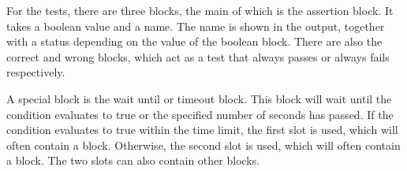 \documentclass[../main]{subfiles}
\begin{document}
\begin{wide}
    \begin{varwidth}{0.40\linewidth}
        \begin{scratch}[scale=0.7]
        \end{scratch}
    \end{varwidth}%
    \hspace{1em}%
    \begin{varwidth}{0.28\linewidth}
        \begin{scratch}[scale=0.7]
        \end{scratch}
    \end{varwidth}%
    \hspace{1em}%
    \begin{varwidth}{0.25\linewidth}
        \begin{scratch}[scale=0.7]
        \end{scratch}
    \end{varwidth}
\end{wide}

For the tests, there are three blocks, the main of which is the assertion block.
It takes a boolean value and a name.
The name is shown in the output, together with a status depending on the value of the boolean block.
There are also the correct and wrong blocks, which act as a test that always passes or always fails respectively.

\begin{scratch}[scale=0.7,else word={}]
\end{scratch}

A special block is the wait until or timeout block.
This block will wait until the condition evaluates to true or the specified number of seconds has passed.
If the condition evaluates to true within the time limit, the first slot is used, which will often contain a  block.
Otherwise, the second slot is used, which will often contain a  block.
The two slots can also contain other blocks.
\end{document}
